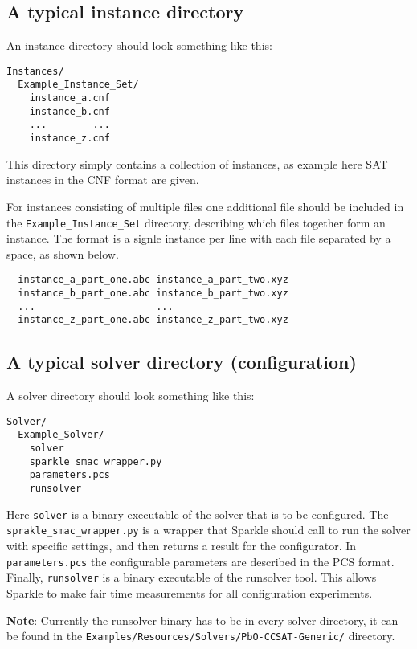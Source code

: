 \documentclass{article}
\begin{document}
\subsection{A typical instance directory}
\label{dir:instances}

An instance directory should look something like this:

\begin{verbatim}
Instances/
  Example_Instance_Set/
    instance_a.cnf
    instance_b.cnf
    ...        ...
    instance_z.cnf
\end{verbatim}

This directory simply contains a collection of instances, as example here SAT instances in the CNF format are given.

For instances consisting of multiple files one additional file should be included in the \texttt{Example\_Instance\_Set} directory, describing which files together form an instance. The format is a signle instance per line with each file separated by a space, as shown below.

\begin{verbatim}
  instance_a_part_one.abc instance_a_part_two.xyz
  instance_b_part_one.abc instance_b_part_two.xyz
  ...                     ...
  instance_z_part_one.abc instance_z_part_two.xyz
\end{verbatim}

\subsection{A typical solver directory (configuration)}
\label{dir:solvers}

A solver directory should look something like this:

\begin{verbatim}
Solver/
  Example_Solver/
    solver
    sparkle_smac_wrapper.py
    parameters.pcs
    runsolver
\end{verbatim}

Here \texttt{solver} is a binary executable of the solver that is to be configured. The \texttt{sprakle\_smac\_wrapper.py} is a wrapper that Sparkle should call to run the solver with specific settings, and then returns a result for the configurator. In \texttt{parameters.pcs} the configurable parameters are described in the PCS format. Finally, \texttt{runsolver} is a binary executable of the runsolver tool. This allows Sparkle to make fair time measurements for all configuration experiments.

\textbf{Note}: Currently the runsolver binary has to be in every solver directory, it can be found in the \texttt{Examples/Resources/Solvers/PbO-CCSAT-Generic/} directory.
\end{document}
